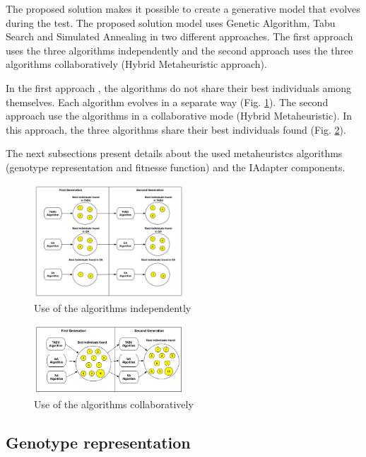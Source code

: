The proposed solution makes it possible to create a generative model that evolves during the test. The proposed solution model uses Genetic Algorithm, Tabu Search and Simulated Annealing in two different approaches.  The first approach uses the three algorithms independently and the second approach uses the three algorithms collaboratively (Hybrid Metaheuristic approach).

In the first approach , the algorithms do not share their best individuals among themselves. Each algorithm evolves in a separate way (Fig. \ref{fig:firstaproach}). The second approach use the algorithms in a collaborative mode (Hybrid Metaheuristic). In this approach, the three algorithms share their best individuals found (Fig. \ref{fig:secondapproach}).

The next subsections present details about the used metaheuristcs algorithms (genotype representation and fitnesse function) and the IAdapter components.

\begin{figure}[h]
\includegraphics[width=0.5\textwidth]{./images/independ.png}
\caption{Use of the algorithms independently}
\label{fig:firstaproach}
\end{figure}
\begin{figure}
\includegraphics[width=0.5\textwidth]{./images/collaborative.png}
\caption{Use of the  algorithms collaboratively}
\label{fig:secondapproach}
\end{figure}

\subsection{Genotype representation}

